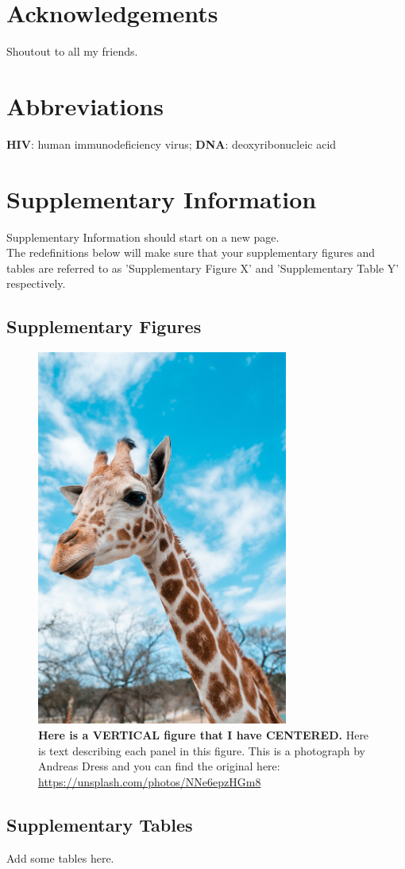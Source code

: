 \documentclass{getwriting}
\begin{document}
\section*{Acknowledgements}
Shoutout to all my friends. 
\section*{Abbreviations}
\textbf{HIV}: human immunodeficiency virus; \textbf{DNA}: deoxyribonucleic acid
\newpage
\section*{Supplementary Information}
\label{suppinfo}
Supplementary Information should start on a new page. \\
The redefinitions below will make sure that your supplementary figures and tables are referred to as 'Supplementary Figure X' and 'Supplementary Table Y' respectively.
\setcounter{figure}{0}    
\renewcommand{\figurename}{Supplementary Figure }
\makeatletter
\def\fnum@figure{\figurename\thefigure}
\makeatother
\renewcommand{\tablename}{Supplementary Table }
\newpage
\subsection*{Supplementary Figures}
\begin{figure}[H]
\label{fig:supplementaryfigure1}
\begin{center}
\includegraphics[width=3.25in]{supplementaryTest.jpg}
\end{center}
\caption{\textbf{Here is a VERTICAL figure that I have CENTERED.} Here is text describing each panel in this figure. This is a photograph by Andreas Dress and you can find the original here: \url{https://unsplash.com/photos/NNe6epzHGm8}}
\end{figure}
\newpage
\subsection*{Supplementary Tables}
Add some tables here.
\newpage

\end{document}
